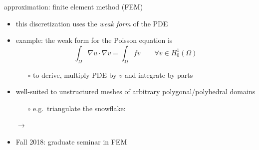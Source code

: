\documentclass[hide notes,intlimits,usenames,dvipsnames]{beamer}
\newcommand{\grad}{\nabla}
\begin{document}
\begin{frame}{approximation: finite element method (FEM)}
\begin{itemize}
\item this discretization uses the \emph{weak form} of the PDE
\item example: the weak form for the Poisson equation is
    $$\int_\Omega \grad u \cdot \grad v = \int_\Omega f v \qquad \forall v \in H_0^1(\Omega)$$
    \vspace{-4mm}
	\begin{itemize}
	\item[$\circ$] to derive, multiply PDE by $v$ and integrate by parts
	\end{itemize}
\item well-suited to unstructured meshes of arbitrary polygonal/polyhedral domains
	\begin{itemize}
	\item[$\circ$] e.g.~triangulate the snowflake:
	\end{itemize}

\begin{center}
\begin{tikzpicture}[scale=1.3,baseline]  \end{tikzpicture}
\qquad $\to$ \qquad
\begin{tikzpicture}[scale=1.3,baseline]  \end{tikzpicture}
\end{center}

\footnotesize
\item Fall 2018: graduate seminar in FEM
\end{itemize}
\end{frame}
\end{document}
